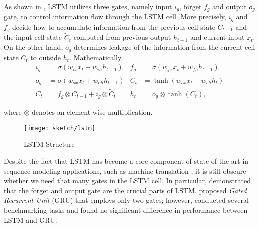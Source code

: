 As shown in \addfigure{\ref{fig:lstm_structure}}, LSTM utilizes three gates, namely input $i_g$, forget $f_g$ and output $o_g$ gate, to control  information flow through the LSTM cell. More precisely, $i_g$ and $f_g$ decide how to accumulate information from the previous cell state $C_{t-1}$ and the input cell state $\widetilde{C}_t$ computed from previous output $h_{t-1}$ and current input $x_t$. On the other hand, $o_g$ determines leakage of the information from the current cell state $C_t$ to outside $h_t$. Mathematically, 
\begin{align*}
	i_g &= \sigma( w_{ix} x_t + w_{ih} h_{t-1} )  &  	f_g &= \sigma( w_{fx} x_t + w_{fh} h_{t-1} )\\
	o_g &= \sigma( w_{ox} x_t + w_{oh} h_{t-1} ) & \widetilde{C}_t &= \tanh(w_{cx} x_t + w_{ch} h_t) \\
	C_t &= f_g \otimes C_{t-1} + i_g  \otimes  \widetilde{C}_t & h_{t} &= o_g \otimes \tanh(C_t),
\end{align*}

where $\otimes$ denotes an element-wise multiplication.


\begin{figure}
\centering
\texttt{[image: sketch/lstm]}
\caption{LSTM Structure} 

\label{fig:lstm_structure} 
\end{figure}

Despite the fact that  LSTM has become a core component of state-of-the-art in sequence modeling applications, such as machine translation \citep{MelisStateArtEvaluation2018}, it is still obscure whether we need that many gates in the LSTM cell. In particular, \citet{GreffLSTMsearchspace2017} demonstrated that the forget and output gate are the crucial parts of LSTM.  \citet{ChoLearningPhraseRepresentations2014a} proposed \textit{Gated Recurrent Unit} (GRU) that employs only two	 gates; however, \citet{JozefowiczEmpiricalExplorationRecurrent2015} conducted several benchmarking tasks and found no significant difference in performance between LSTM and GRU. 

